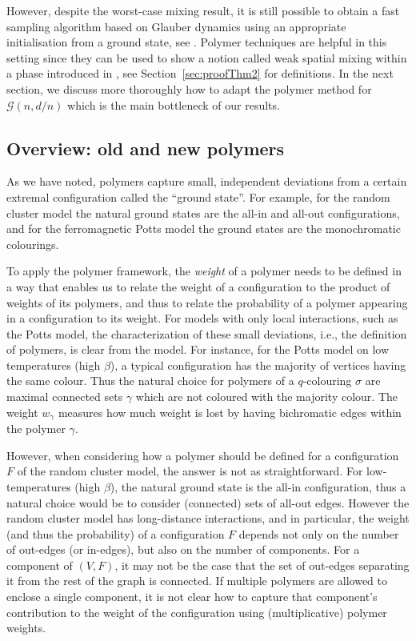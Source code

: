 \documentclass[11pt]{article}
\theoremstyle{plain}
\newcommand{\G}{\mathcal{G}}
\newcommand{\1}{\mathbb{1}}
\begin{document}
However, despite the worst-case mixing result, it is still possible to obtain a fast sampling algorithm based on Glauber dynamics using an appropriate initialisation from a ground state, see  \cite{SinclairsGheissari2022,RClattice,Galanis_Goldberg_Smolarova_2024}. Polymer techniques are helpful in this setting since they can be used to show a notion called weak spatial mixing within a phase introduced in \cite{SinclairsGheissari2022}, see Section~\ref{sec:proofThm2} for definitions. In the next section, we discuss more thoroughly how to adapt the polymer method for $\G(n,d/n)$ which is the main bottleneck of our results.



 
  

\subsection{Overview: old and new polymers}

As we have noted, polymers
capture small, independent deviations  from a certain extremal configuration called the ``ground state''. For example, for the random cluster model the natural ground states are  the all-in and all-out configurations, and for the ferromagnetic Potts model the ground states are the monochromatic colourings. 


To apply the polymer framework, the \textit{weight} of a polymer needs to be defined in a way that
enables 
us to 
relate the weight of a configuration to the product of weights of its polymers, and thus to relate the probability of a polymer appearing in a configuration to its weight. For models with only local interactions, such as the Potts model, the characterization of these small deviations, i.e., the definition of polymers, is clear from the model. For instance, for the Potts model on  low temperatures (high $\beta$), a typical configuration has the majority of vertices having the same colour. Thus the natural choice for polymers of a $q$-colouring $\sigma$ are maximal connected sets $\gamma$ which are not coloured with the majority colour. The weight  $w_\gamma$ measures how much  weight is lost by having bichromatic edges within the polymer $\gamma$.

However, when considering how a polymer should be defined for a configuration $F$ of the random cluster model, the answer is not as straightforward. For low-temperatures (high $\beta$), the natural ground state is the all-in configuration, thus a natural choice would be to consider (connected) sets of all-out edges. However the random cluster model has long-distance interactions, and in particular, the weight (and thus the probability) of a configuration $F$ depends not only on the number of out-edges (or in-edges), but also on the number of components. For a component of \((V,F)\), 
it may not be the case that the set of out-edges separating it from the rest of the graph is connected. If multiple polymers  are allowed to enclose a single component, it is not clear how to capture that component's contribution to the weight of the configuration using (multiplicative) polymer weights.
\end{document}
